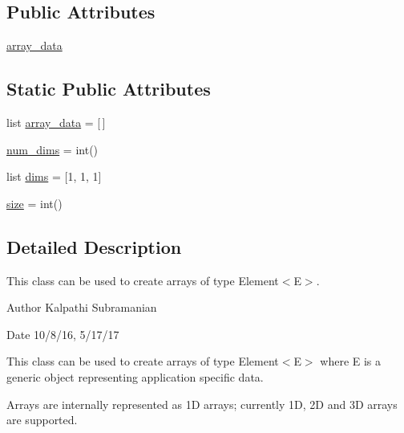 \subsection*{Public Attributes}
\begin{DoxyCompactItemize}
\item 
\hyperlink{class_array_1_1_array_a75d2d3965f5232a430b069c8cce78d80}{array\+\_\+data}
\end{DoxyCompactItemize}
\subsection*{Static Public Attributes}
\begin{DoxyCompactItemize}
\item 
list \hyperlink{class_array_1_1_array_aadd55f758422d491e4a6b51b3652f030}{array\+\_\+data} = \mbox{[}$\,$\mbox{]}
\item 
\hyperlink{class_array_1_1_array_ad20e83f196d6ccc482e3d49adaeaaf71}{num\+\_\+dims} = int()
\item 
list \hyperlink{class_array_1_1_array_ab0f0de822ea2ff937cbfbcf64081ff11}{dims} = \mbox{[}1, 1, 1\mbox{]}
\item 
\hyperlink{class_array_1_1_array_a421362e43ac706de326ea5442db7116b}{size} = int()
\end{DoxyCompactItemize}


\subsection{Detailed Description}
This class can be used to create arrays of type Element$<$\+E$>$. 

\begin{DoxyAuthor}{Author}
Kalpathi Subramanian
\end{DoxyAuthor}
\begin{DoxyDate}{Date}
10/8/16, 5/17/17
\end{DoxyDate}
This class can be used to create arrays of type Element$<$\+E$>$ where E is a generic object representing application specific data.

Arrays are internally represented as 1D arrays; currently 1D, 2D and 3D arrays are supported.


